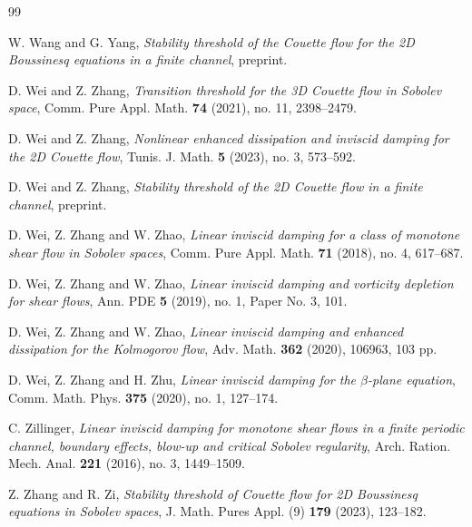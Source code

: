 \documentclass[reqno, 12pt]{amsart} %
\theoremstyle{plain} %
\theoremstyle{definition}
\theoremstyle{remark}
\numberwithin{equation}{section} %
\begin{document}
\begin{thebibliography}{99}
		
		W. Wang and G. Yang, 
		\textit{Stability threshold of the Couette flow for the 2D Boussinesq equations in a finite channel}, 
		preprint.
		
		D. Wei and Z. Zhang, 
		\textit{Transition threshold for the 3D Couette flow in Sobolev space}, 
		Comm. Pure Appl. Math. \textbf{74} (2021), no. 11, 2398–2479.
		
		D. Wei and Z. Zhang, 
		\textit{Nonlinear enhanced dissipation and inviscid damping for the 2D Couette flow}, 
		Tunis. J. Math. \textbf{5} (2023), no. 3, 573–592.
		
		D. Wei and Z. Zhang, 
		\textit{Stability threshold of the 2D Couette flow in a finite channel}, 
		preprint.
		
		D. Wei, Z. Zhang and W. Zhao, 
		\textit{Linear inviscid damping for a class of monotone shear flow in Sobolev spaces}, 
		Comm. Pure Appl. Math. \textbf{71} (2018), no. 4, 617–687.
		
		D. Wei, Z. Zhang and W. Zhao, 
		\textit{Linear inviscid damping and vorticity depletion for shear flows}, 
		Ann. PDE \textbf{5} (2019), no. 1, Paper No. 3, 101.
		
		D. Wei, Z. Zhang and W. Zhao, 
		\textit{Linear inviscid damping and enhanced dissipation for the Kolmogorov flow}, 
		Adv. Math. \textbf{362} (2020), 106963, 103 pp.
		
		D. Wei, Z. Zhang and H. Zhu, 
		\textit{Linear inviscid damping for the $\beta$-plane equation}, 
		Comm. Math. Phys. \textbf{375} (2020), no. 1, 127–174.
		
		C. Zillinger, 
		\textit{Linear inviscid damping for monotone shear flows in a finite periodic channel, boundary effects, blow-up and critical Sobolev regularity}, 
		Arch. Ration. Mech. Anal. \textbf{221} (2016), no. 3, 1449–1509.
		
		
		
		
		Z. Zhang and R. Zi, 
		\textit{Stability threshold of Couette flow for 2D Boussinesq equations in Sobolev spaces}, 
		J. Math. Pures Appl. (9) \textbf{179} (2023), 123–182.
		
		

		
		


       
	\end{thebibliography}
	
	
	
	
	
	
	
	
	
	
	
	
	
	
	
	
\end{document}
